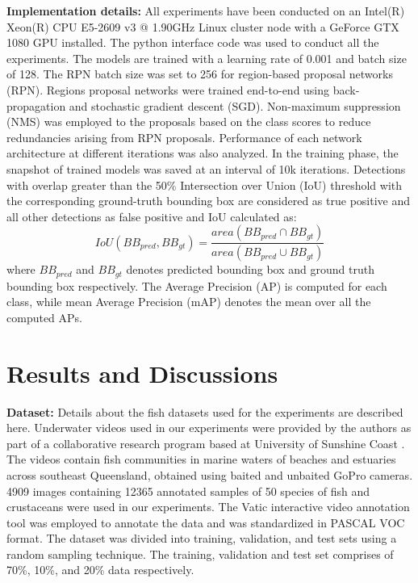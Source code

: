 \documentclass[conference]{IEEEtran}       %
\begin{document}
{\bf Implementation details:} All experiments have been conducted on an Intel(R) Xeon(R) CPU E5-2609 v3 @ 1.90GHz Linux cluster node with a GeForce GTX 1080 GPU installed. The python interface code was used to conduct all the experiments. The models are trained with a learning rate of 0.001 and batch size of 128. The RPN batch size was set to 256 for region-based proposal networks (RPN). Regions proposal networks were trained end-to-end using back-propagation and stochastic gradient descent (SGD). Non-maximum suppression (NMS) was employed to the proposals based on the class scores to reduce redundancies arising from RPN proposals. Performance of each network architecture at different iterations was also analyzed. In the training phase, the snapshot of trained models was saved at an interval of 10k iterations. Detections with overlap greater than the 50\% Intersection over Union (IoU) threshold with the corresponding ground-truth bounding box are considered as true positive and all other detections as false positive  and IoU calculated as:
\begin{equation}
\label{eq_iou}
IoU(BB_{pred}, BB_{gt}) = \frac{area(BB_{pred}\cap BB_{gt})}{area(BB_{pred} \cup BB_{gt})}
\end{equation}
where $BB_{pred}$ and $BB_{gt}$ denotes predicted bounding box and ground truth bounding box respectively. The Average Precision (AP) is computed for each class, while mean Average Precision (mAP) denotes the mean over all the computed APs.
\section{Results and Discussions}
\label{results}
{\bf Dataset:} Details about the fish datasets used for the experiments are described here. Underwater videos used in our experiments were provided by the authors as part of a collaborative research program based at University of Sunshine Coast \cite{Borland2k17, GILBY2017132}. The videos contain fish communities in marine waters of beaches and estuaries across southeast Queensland, obtained using baited and unbaited GoPro cameras. 4909 images containing 12365 annotated samples of 50 species of fish and crustaceans were used in our experiments. The Vatic  interactive video annotation tool \cite{springerlink:10.1007/s11263-012-0564-1} was employed to annotate the data and was standardized in PASCAL VOC \cite{Everingham15} format. The dataset was divided into training, validation, and test sets using a random sampling technique. The training, validation and test set comprises of 70\%, 10\%, and 20\% data respectively.
\end{document}
